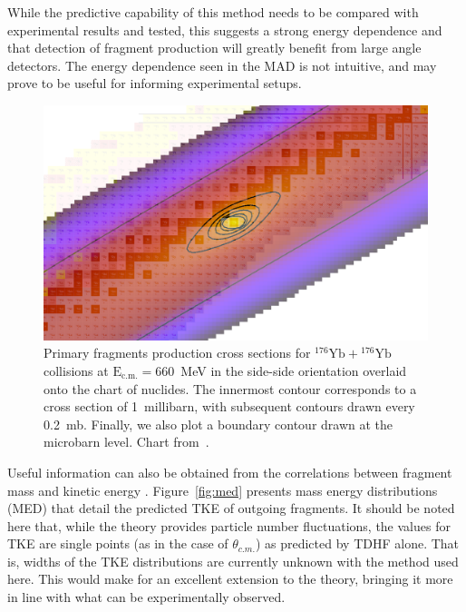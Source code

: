 While the predictive capability of this method needs to be compared with experimental results and tested, this suggests a strong energy dependence and that detection of fragment production will greatly benefit from large angle detectors.
The energy dependence seen in the MAD is not intuitive, and may prove to be useful for informing experimental setups.
\begin{figure}
	\includegraphics*[width=\textwidth]{../Figures/YbYb/combinedchart.pdf}
	\caption{Primary fragments production cross sections for $^{176}\mathrm{Yb}+{}^{176}\mathrm{Yb}$ collisions at $\mathrm{E_{c.m.}}=660$~MeV in the side-side orientation overlaid onto the chart of nuclides. 
		The innermost contour corresponds to a cross section of 1~millibarn, with subsequent contours drawn every 0.2~mb.
		Finally, we also plot a boundary contour drawn at the microbarn level. Chart from~\protect\citep{anu_chart}.}
	\label{fig:chart}
\end{figure}

Useful information can also be obtained from the correlations between fragment mass and kinetic energy \citep{itkis2004,itkis2011,itkis2015,kozulin2019,banerjee2019}.
Figure~\ref{fig:med} presents mass energy distributions (MED) that detail the predicted TKE of outgoing fragments.
It should be noted here that, while the theory provides particle number fluctuations, the values for TKE are single points (as in the case of $\theta_{c.m.}$) as predicted by TDHF alone.
That is, widths of the TKE distributions are currently unknown with the method used here.
This would make for an excellent extension to the theory, bringing it more in line with what can be experimentally observed.

